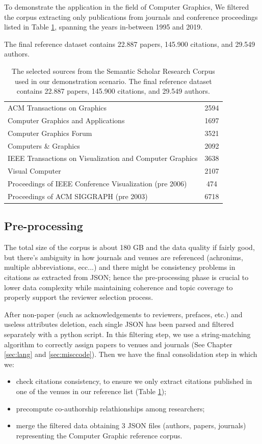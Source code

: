 To demonstrate the application in the field of Computer Graphics, We filtered the corpus extracting only publications from journals and conference proceedings listed in Table \ref{table:sources}, spanning the years in-between 1995 and 2019. 

The final reference dataset contains 22.887 papers, 145.900 citations, and 29.549 authors.
\begin{table}[!ht]
\renewcommand{\arraystretch}{1.3}
\centering
\begin{tabular}{|l|c|}
\hline
ACM Transactions on Graphics & 2594\\ 
Computer Graphics and Applications  & 1697 \\ 
Computer Graphics Forum & 3521\\ 
Computers \& Graphics & 2092\\ 
IEEE Transactions on Visualization and Computer Graphics & 3638\\ 
Visual Computer & 2107\\ 
Proceedings of IEEE Conference Visualization (pre 2006) & 474 \\ 
Proceedings of ACM SIGGRAPH (pre 2003) & 6718\\
\hline
\end{tabular}
\caption{The selected sources from the Semantic Scholar Research Corpus used in our demonstration scenario. The final reference dataset contains 22.887 papers, 145.900 citations, and 29.549 authors.}
\label{table:sources}
\end{table}

%
\subsection*{Pre-processing}
\label{sec:preproc}

The total size of the corpus is about 180 GB and the data quality if fairly good, but there's ambiguity in how journals and venues are referenced (achronims, multiple abbreviations, ecc...) and there might be consistency problems in citations as extracted from JSON; hence the pre-processing phase is crucial to lower data complexity while maintaining coherence and topic coverage to properly support the reviewer selection process. 

After non-paper (such as acknowledgements to reviewers, prefaces, etc.) and useless attributes deletion, each single JSON has been parsed and filtered separately with a python script. In this filtering step, we use a string-matching algorithm to correctly assign papers to venues and journals (See Chapter \ref{sec:lang} and \ref{sec:misccode}). Then we have the final consolidation step in which we:
\begin{itemize}
    \item check citations consistency, to ensure we only extract citations published in one of the venues in our reference list (Table \ref{table:sources});
    \item precompute co-authorship relathionships among researchers;
    \item merge the filtered data obtaining 3 JSON files (authors, papers, journals) representing the Computer Graphic reference corpus.
\end{itemize}

